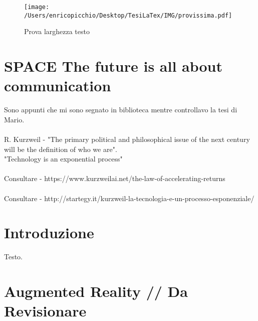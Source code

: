\documentclass[11pt,a4paper]{article}
\begin{document}
\begin{figure}[h!] %
\centerline {\texttt{[image: /Users/enricopicchio/Desktop/TesiLaTex/IMG/provissima.pdf]}}
\caption{Prova larghezza  testo}
\end{figure}

\newpage
\section{SPACE The future is all about communication}

\noindent
Sono appunti che mi sono segnato in biblioteca mentre  controllavo  la tesi di Mario.\\
\\
R. Kurzweil - "The primary political and philosophical issue of the next century will be the definition of who we are".\\
"Technology is an exponential process"\\
\\Consultare - https://www.kurzweilai.net/the-law-of-accelerating-returns\\
\\Consultare - http://startegy.it/kurzweil-la-tecnologia-e-un-processo-esponenziale/


\newpage
\section{Introduzione}

{\color{red}
\noindent %
Testo.}

\newpage
\section{Augmented Reality // Da Revisionare}
\end{document}
